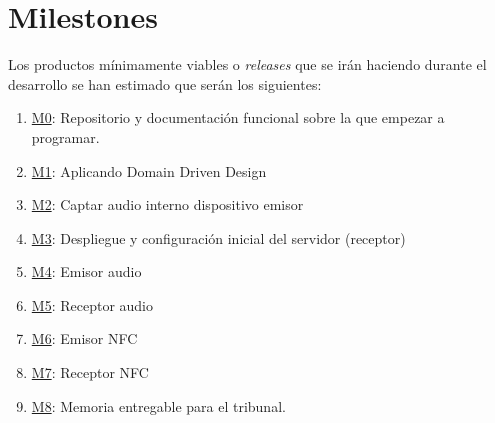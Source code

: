 \section{Milestones}
Los productos mínimamente viables o \emph{releases} que se irán haciendo durante el
desarrollo se han estimado que serán los siguientes:

\begin{enumerate}
    \item \href{https://github.com/migueorg/One-touch-music-streaming-TFG-ETSIIT/milestone/1}{M0}: Repositorio y documentación funcional sobre la que empezar a programar.
    \item \href{https://github.com/migueorg/One-touch-music-streaming-TFG-ETSIIT/milestone/2}{M1}: Aplicando Domain Driven Design
    \item \href{https://github.com/migueorg/One-touch-music-streaming-TFG-ETSIIT/milestone/3}{M2}: Captar audio interno dispositivo emisor
    \item \href{https://github.com/migueorg/One-touch-music-streaming-TFG-ETSIIT/milestone/4}{M3}: Despliegue y configuración inicial del servidor (receptor)
    \item \href{https://github.com/migueorg/One-touch-music-streaming-TFG-ETSIIT/milestone/5}{M4}: Emisor audio
    \item \href{https://github.com/migueorg/One-touch-music-streaming-TFG-ETSIIT/milestone/6}{M5}: Receptor audio
    \item \href{https://github.com/migueorg/One-touch-music-streaming-TFG-ETSIIT/milestone/8}{M6}: Emisor NFC
    \item \href{https://github.com/migueorg/One-touch-music-streaming-TFG-ETSIIT/milestone/9}{M7}: Receptor NFC
    \item \href{https://github.com/migueorg/One-touch-music-streaming-TFG-ETSIIT/milestone/10}{M8}: Memoria entregable para el tribunal.
\end{enumerate}